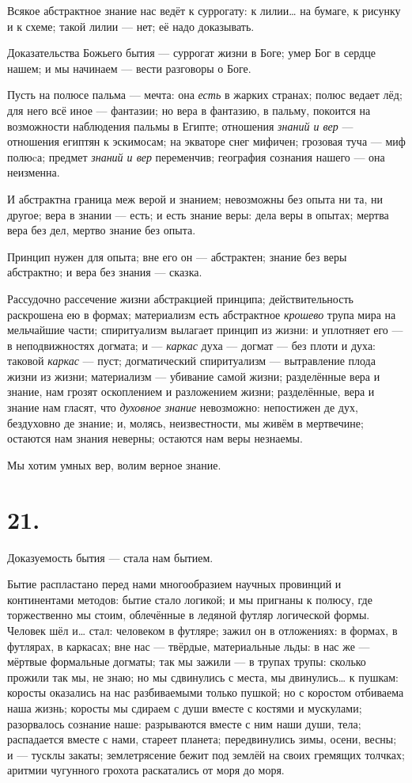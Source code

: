 \documentclass[12pt,a4paper,oneside]{book}
\begin{document}
Всякое абстрактное знание нас ведёт к суррогату: к лилии… на бумаге, к рисунку и к схеме; такой лилии — нет; её надо доказывать.

Доказательства Божьего бытия — суррогат жизни в Боге; умер Бог в сердце нашем; и мы начинаем — вести разговоры о Боге.

Пусть на полюсе пальма — мечта: она \emph{есть} в жарких странах; полюс ведает лёд; для него всё иное — фантазии; но вера в фантазию, в пальму, покоится на возможности наблюдения пальмы в Египте; отношения \emph{знаний и вер} — отношения египтян к эскимосам; на экваторе снег мифичен; грозовая туча — миф полюcа; предмет \emph{знаний и вер} переменчив; география сознания нашего — она неизменна.

И абстрактна граница меж верой и знанием; невозможны без опыта ни та, ни другое; вера в знании — есть; и есть знание веры: дела веры в опытах; мертва вера без дел, мертво знание без опыта.

Принцип нужен для опыта; вне его он — абстрактен; знание без веры абстрактно; и вера без знания — сказка.

Рассудочно рассечение жизни абстракцией принципа; действительность раскрошена ею в формах; материализм есть абстрактное \emph{крошево} трупа мира на мельчайшие части; спиритуализм вылагает принцип из жизни: и уплотняет его — в неподвижностях догмата; и — \emph{каркас} духа — догмат — без плоти и духа: таковой \emph{каркас} — пуст; догматический спиритуализм — вытравление плода жизни из жизни; материализм — убивание самой жизни; разделённые вера и знание, нам грозят оскоплением и разложением жизни; разделённые, вера и знание нам гласят, что \emph{духовное знание} невозможно: непостижен де дух, бездуховно де знание; и, молясь, неизвестности, мы живём в мертвечине; остаются нам знания неверны; остаются нам веры незнаемы.

Мы хотим умных вер, волим верное знание.

\section*{21.}

Доказуемость бытия — стала нам бытием.

Бытие распластано перед нами многообразием научных провинций и континентами методов: бытие стало логикой; и мы пригнаны к полюсу, где торжественно мы стоим, облечённые в ледяной футляр логической формы. Человек шёл и… стал: человеком в футляре; зажил он в отложениях: в формах, в футлярах, в каркасах; вне нас — твёрдые, материальные льды: в нас же — мёртвые формальные догматы; так мы зажили — в трупах трупы: сколько прожили так мы, не знаю; но мы сдвинулись с места, мы двинулись… к пушкам: коросты оказались на нас разбиваемыми только пушкой; но с коростом отбиваема наша жизнь; коросты мы сдираем с души вместе с костями и мускулами; разорвалось сознание наше: разрываются вместе с ним наши души, тела; распадается вместе с нами, стареет планета; передвинулись зимы, осени, весны; и — тусклы закаты; землетрясение бежит под землёй на своих гремящих толчках; аритмии чугунного грохота раскатались от моря до моря.
\end{document}
